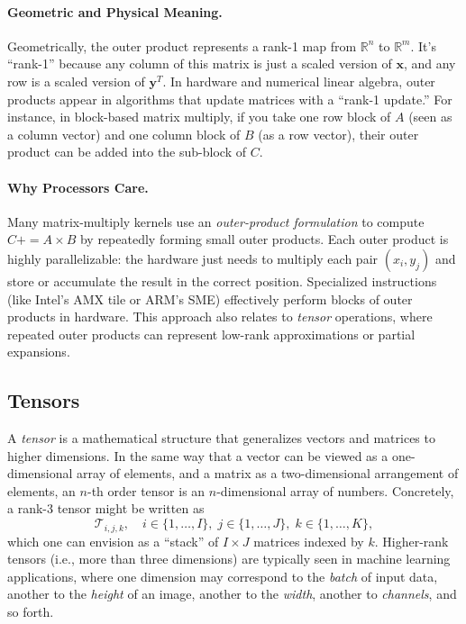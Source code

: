 \paragraph{Geometric and Physical Meaning.} 
Geometrically, the outer product represents a rank-1 map from $\mathbb{R}^n$ to $\mathbb{R}^m$. It’s “rank-1” because any column of this matrix is just a scaled version of $\mathbf{x}$, and any row is a scaled version of $\mathbf{y}^T$. In hardware and numerical linear algebra, outer products appear in algorithms that update matrices with a “rank-1 update.” For instance, in block-based matrix multiply, if you take one row block of $A$ (seen as a column vector) and one column block of $B$ (as a row vector), their outer product can be added into the sub-block of $C$. 

\paragraph{Why Processors Care.} 
Many matrix-multiply kernels use an \emph{outer-product formulation} to compute $C += A \times B$ by repeatedly forming small outer products. Each outer product is highly parallelizable: the hardware just needs to multiply each pair $(x_i, y_j)$ and store or accumulate the result in the correct position. Specialized instructions (like Intel’s AMX tile or ARM’s SME) effectively perform blocks of outer products in hardware. This approach also relates to \emph{tensor} operations, where repeated outer products can represent low-rank approximations or partial expansions.

\subsection{Tensors}
A \emph{tensor} is a mathematical structure that generalizes vectors and matrices to higher dimensions. 
In the same way that a vector can be viewed as a one-dimensional array of elements, and a matrix as 
a two-dimensional arrangement of elements, an $n$-th order tensor is an $n$-dimensional array 
of numbers. Concretely, a rank-3 tensor might be written as
\[
\mathcal{T}_{i,j,k}, \quad i \in \{1,\dots,I\}, \; j \in \{1,\dots,J\}, \; k \in \{1,\dots,K\},
\]
which one can envision as a ``stack'' of $I \times J$ matrices indexed by $k$. Higher-rank tensors 
(i.e., more than three dimensions) are typically seen in machine learning applications, where one 
dimension may correspond to the \emph{batch} of input data, another to the \emph{height} of an image, 
another to the \emph{width}, another to \emph{channels}, and so forth.

